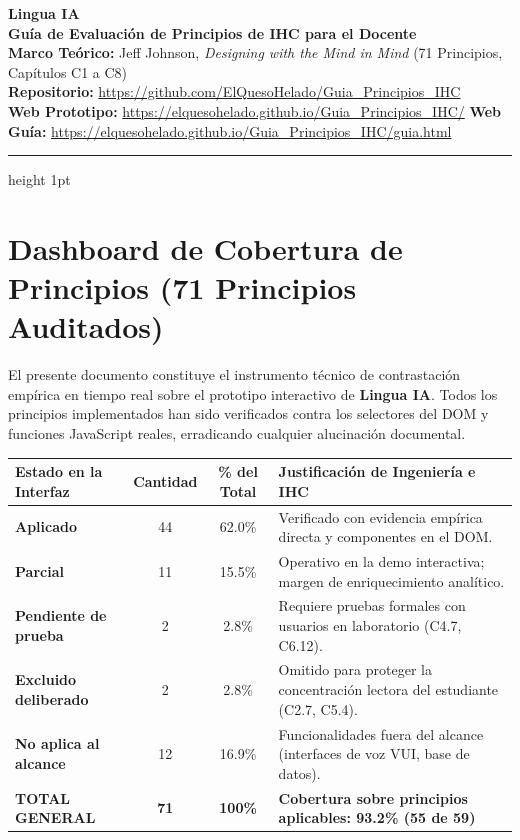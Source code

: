 \documentclass[10pt,a4paper]{article}
\begin{document}
\begin{center}
    {\huge\textbf{\textcolor{linguaDarkTeal}{Lingua IA}}}\\[0.3em]
    {\Large\textbf{Guía de Evaluación de Principios de IHC para el Docente}}\\[0.5em]
    {\normalsize\textbf{Marco Teórico:} Jeff Johnson, \textit{Designing with the Mind in Mind} (71 Principios, Capítulos C1 a C8)}\\[0.3em]
    {\small\textbf{Repositorio:} \url{https://github.com/ElQuesoHelado/Guia_Principios_IHC}}\\[0.2em]
    {\small\textbf{Web Prototipo:} \url{https://elquesohelado.github.io/Guia_Principios_IHC/}} \quad \textbar{} \quad
    {\small\textbf{Web Guía:} \url{https://elquesohelado.github.io/Guia_Principios_IHC/guia.html}}
\end{center}

\vspace{0.8em}
\hrule height 1pt
\vspace{1em}

\section{Dashboard de Cobertura de Principios (71 Principios Auditados)}

El presente documento constituye el instrumento técnico de contrastación empírica en tiempo real sobre el prototipo interactivo de \textbf{Lingua IA}. Todos los principios implementados han sido verificados contra los selectores del DOM y funciones JavaScript reales, erradicando cualquier alucinación documental.

\vspace{0.6em}
\begin{table}[H]
\centering
\small
\begin{tabular}{lccl}
\toprule
\textbf{Estado en la Interfaz} & \textbf{Cantidad} & \textbf{\% del Total} & \textbf{Justificación de Ingeniería e IHC} \\
\midrule
\textbf{Aplicado} & 44 & 62.0\% & Verificado con evidencia empírica directa y componentes en el DOM. \\
\textbf{Parcial} & 11 & 15.5\% & Operativo en la demo interactiva; margen de enriquecimiento analítico. \\
\textbf{Pendiente de prueba} & 2 & 2.8\% & Requiere pruebas formales con usuarios en laboratorio (C4.7, C6.12). \\
\textbf{Excluido deliberado} & 2 & 2.8\% & Omitido para proteger la concentración lectora del estudiante (C2.7, C5.4). \\
\textbf{No aplica al alcance} & 12 & 16.9\% & Funcionalidades fuera del alcance (interfaces de voz VUI, base de datos). \\
\midrule
\textbf{TOTAL GENERAL} & \textbf{71} & \textbf{100\%} & \textbf{Cobertura sobre principios aplicables: 93.2\% (55 de 59)} \\
\bottomrule
\end{tabular}
\end{table}
\end{document}
